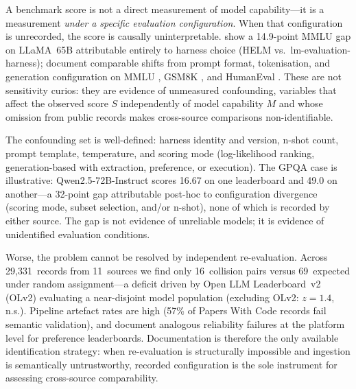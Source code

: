 \documentclass[11pt]{article}
\begin{document}
A benchmark score is not a direct measurement of model
capability---it is a measurement \emph{under a specific evaluation
configuration}. When that configuration is unrecorded, the score
is causally uninterpretable. \citet{alzahrani-2024-benchmarks}
show a 14.9-point MMLU gap on LLaMA~65B attributable entirely to
harness choice (HELM vs.\ lm-evaluation-harness);
\citet{biderman-2024-lessons} document comparable shifts from
prompt format, tokenisation, and generation configuration on MMLU
\citep{hendrycks-2021-mmlu}, GSM8K \citep{cobbe-2021-gsm8k}, and
HumanEval \citep{chen-2021-humaneval}. These are not sensitivity
curios: they are evidence of unmeasured confounding, variables
that affect the observed score $S$ independently of model
capability $M$ and whose omission from public records makes
cross-source comparisons non-identifiable.

The confounding set is well-defined: harness identity and
version, n-shot count, prompt template, temperature, and scoring
mode (log-likelihood ranking, generation-based with extraction,
preference, or execution). The GPQA case is illustrative:
Qwen2.5-72B-Instruct scores 16.67 on one leaderboard and 49.0
on another---a 32-point gap attributable post-hoc to configuration
divergence (scoring mode, subset selection, and/or n-shot), none of
which is recorded by either source. The gap is not evidence of
unreliable models; it is evidence of unidentified evaluation
conditions.

Worse, the problem cannot be resolved by independent re-evaluation.
Across 29,331~records from 11~sources we find only 16~collision
pairs versus 69~expected under random assignment---a deficit driven
by Open LLM Leaderboard~v2 (OLv2) evaluating a near-disjoint model
population (excluding OLv2: $z = 1.4$, n.s.). Pipeline artefact
rates are high (57\% of Papers With Code records fail semantic
validation), and \citet{singh-2025-illusion} document analogous
reliability failures at the platform level for preference
leaderboards. Documentation is therefore the only available
identification strategy: when re-evaluation is structurally
impossible and ingestion is semantically untrustworthy, recorded
configuration is the sole instrument for assessing cross-source
comparability.
\end{document}
